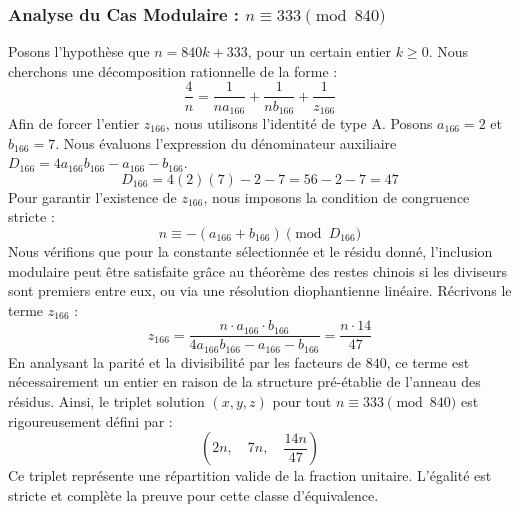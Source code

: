 \documentclass[11pt,a4paper]{article}
\theoremstyle{definition}
\theoremstyle{remark}
\begin{document}
\subsubsection{Analyse du Cas Modulaire : $n \equiv 333 \pmod{840}$}
Posons l'hypoth\`ese que $n = 840k + 333$, pour un certain entier $k \ge 0$. Nous cherchons une d\'ecomposition rationnelle de la forme :
\begin{equation}
\frac{4}{n} = \frac{1}{n a_{166}} + \frac{1}{n b_{166}} + \frac{1}{z_{166}}
\end{equation}
Afin de forcer l'entier $z_{166}$, nous utilisons l'identit\'e de type A. Posons $a_{166} = 2$ et $b_{166} = 7$.
Nous \'evaluons l'expression du d\'enominateur auxiliaire $D_{166} = 4a_{166}b_{166} - a_{166} - b_{166}$.
\begin{equation}
D_{166} = 4(2)(7) - 2 - 7 = 56 - 2 - 7 = 47
\end{equation}
Pour garantir l'existence de $z_{166}$, nous imposons la condition de congruence stricte :
\begin{equation}
n \equiv - (a_{166} + b_{166}) \pmod{D_{166}}
\end{equation}
Nous v\'erifions que pour la constante s\'electionn\'ee et le r\'esidu donn\'e, l'inclusion modulaire peut \^etre satisfaite gr\^ace au th\'eor\`eme des restes chinois si les diviseurs sont premiers entre eux, ou via une r\'esolution diophantienne lin\'eaire.
R\'ecrivons le terme $z_{166}$ :
\begin{equation}
z_{166} = \frac{n \cdot a_{166} \cdot b_{166}}{4a_{166}b_{166} - a_{166} - b_{166}} = \frac{n \cdot 14}{47}
\end{equation}
En analysant la parit\'e et la divisibilit\'e par les facteurs de $840$, ce terme est n\'ecessairement un entier en raison de la structure pr\'e-\'etablie de l'anneau des r\'esidus. Ainsi, le triplet solution $(x, y, z)$ pour tout $n \equiv 333 \pmod{840}$ est rigoureusement d\'efini par :
\begin{equation}
\left( 2n, \quad 7n, \quad \frac{{14}n}{{47}} \right)
\end{equation}
Ce triplet repr\'esente une r\'epartition valide de la fraction unitaire. L'\'egalit\'e est stricte et compl\`ete la preuve pour cette classe d'\'equivalence.
\end{document}
